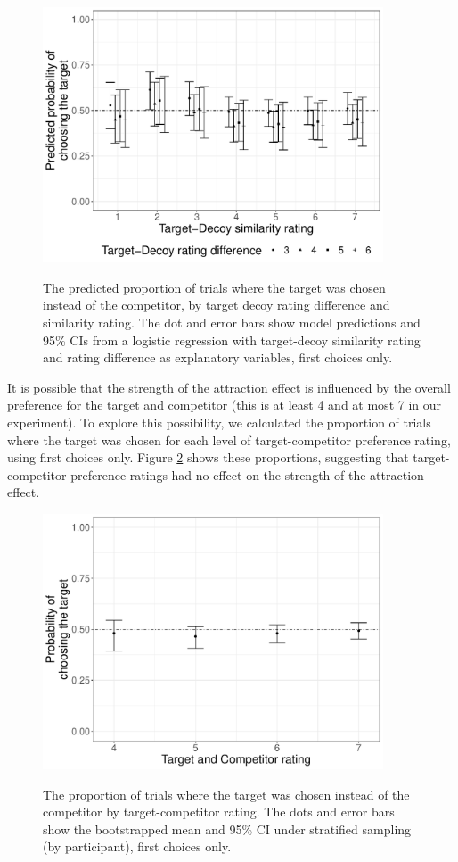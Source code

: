 \documentclass[12pt, a4paper]{article}
\begin{document}
\begin{figure}[htb!]
\centering
		\caption{The predicted proportion of trials where the target was chosen instead of the competitor, by target decoy rating difference and similarity rating. The dot and error bars show model predictions and 95\% CIs from a logistic regression with target-decoy similarity rating and rating difference as explanatory variables, first choices only.}
\includegraphics[width=0.9\textwidth]{figure6.pdf}
\label{fig:TD_fig}
\end{figure}

It is possible that the strength of the attraction effect is influenced by the overall preference for the target and competitor (this is at least 4 and at most 7 in our experiment). To explore this possibility, we calculated the proportion of trials where the target was chosen for each level of target-competitor preference rating, using first choices only. Figure \ref{fig:TC_fig} shows these proportions, suggesting that target-competitor preference ratings had no effect on the strength of the attraction effect. 




\begin{figure}[htb!]
\centering
		\caption{The proportion of trials where the target was chosen instead of the competitor by target-competitor rating. The dots and error bars show the bootstrapped mean and 95\% CI under stratified sampling (by participant), first choices only.}
\includegraphics[width=0.9\textwidth]{figure7.pdf}
\label{fig:TC_fig}
\end{figure}
\end{document}
